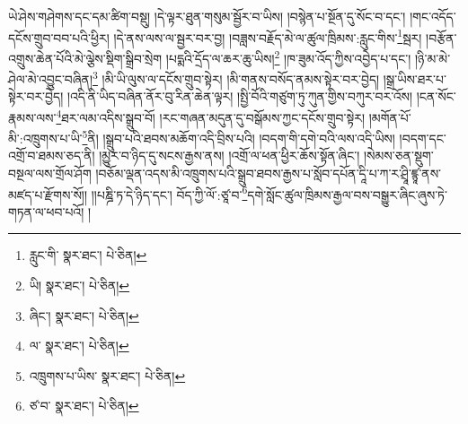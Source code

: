 ཡེ་ཤེས་གཤེགས་དང་དམ་ཚིག་བསྡུ། །དེ་ལྟར་ཐུན་གསུམ་སྦྱོར་བ་ཡིས། །བསྙེན་པ་སྔོན་དུ་སོང་བ་དང་། །གང་འདོད་དངོས་གྲུབ་བབ་པའི་ཕྱིར། །དེ་ནས་ལས་ལ་སྦྱར་བར་བྱ། །བཟླས་བརྗོད་མེ་ལ་ཚུལ་ཁྲིམས་:རླུང་གིས་\footnote{རླུང་གི་  སྣར་ཐང་།  པེ་ཅིན། }སྦར། །བརྩོན་འགྲུས་ཆེན་པོའི་མེ་ལྕེས་སྡིག་སྒྲིབ་སྲེག །པདྨའི་དྲོད་ལ་ཆར་ཆུ་ཡིས།\footnote{ཡི།  སྣར་ཐང་།  པེ་ཅིན། } །ཁ་ཟུམ་འོད་ཀྱིས་འབྱེད་པ་དང་། །ཉི་མ་མེ་ཤེལ་མེ་འབྱུང་བཞིན།\footnote{ཞིང་།  སྣར་ཐང་།  པེ་ཅིན། } །མི་ཡི་ལུས་ལ་དངོས་གྲུབ་སྟེར། །མི་གནས་བསོད་ནམས་སྟེར་བར་བྱེད། །སྒྲ་ཡིས་ཐར་པ་སྟེར་བར་བྱེད། །འདི་ནི་ཡིད་བཞིན་ནོར་བུ་རིན་ཆེན་ལྟར། །སྤྱི་བོའི་གཙུག་ཏུ་ཀུན་གྱིས་བཀུར་བར་འོས། །ངན་སོང་རྣམས་ལས་\footnote{ལ་  སྣར་ཐང་།  པེ་ཅིན། }ཐར་ལམ་འདིས་སྒྲུབ་བོ། །རང་གཞན་མདུན་དུ་བསྒོམས་ཀྱང་དངོས་གྲུབ་སྟེར། །མགོན་པོ་མི་:འཁྲུགས་པ་ཡི་\footnote{འཁྲུགས་པ་ཡིས་  སྣར་ཐང་།  པེ་ཅིན། }ནི། །སྒྲུབ་པའི་ཐབས་མཆོག་འདི་བྲིས་པའི། །བདག་གི་དགེ་བའི་ལས་འདི་ཡིས། །བདག་དང་འགྲོ་བ་ཐམས་ཅད་ནི། །མྱུར་བ་ཉིད་དུ་སངས་རྒྱས་ནས། །འགྲོ་ལ་ཕན་ཕྱིར་ཆོས་སྟོན་ཞིང་། །སེམས་ཅན་སྡུག་བསྔལ་ལས་གྲོལ་ཤོག །བཅོམ་ལྡན་འདས་མི་འཁྲུགས་པའི་སྒྲུབ་ཐབས་རྒྱས་པ་སློབ་དཔོན་དཱི་པ་ཀ་ར་ཤྲཱི་ཛྙཱ་ནས་མཛད་པ་རྫོགས་སོ།། །།པཎྜི་ཏ་དེ་ཉིད་དང་། བོད་ཀྱི་ལོ་:ཙཱ་བ་\footnote{ཙ་བ་  སྣར་ཐང་།  པེ་ཅིན། }དགེ་སློང་ཚུལ་ཁྲིམས་རྒྱལ་བས་བསྒྱུར་ཞིང་ཞུས་ཏེ་གཏན་ལ་ཕབ་པའོ། ། 